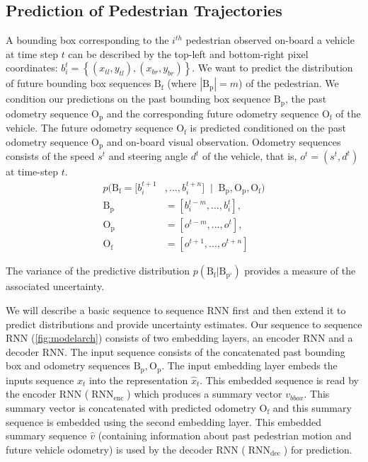 \subsection{Prediction of Pedestrian Trajectories}\label{sec:pedestrian_motion}
A bounding box corresponding to the $i^{th}$ pedestrian observed on-board a vehicle at time step $t$ can be described by the top-left and bottom-right pixel coordinates: $b_{i}^{t} = \left\{(x_{tl},y_{tl}),(x_{br},y_{br})\right\}$. We want to predict the distribution of future bounding box sequences $\text{B}_{\text{f}}$ (where $| \text{B}_{\text{p}}| = m$) of the pedestrian. We condition our predictions on the past bounding box sequence $\text{B}_{\text{p}}$, the past odometry sequence $\text{O}_{\text{p}}$ and the corresponding future odometry sequence $\text{O}_{\text{f}}$ of the vehicle. The future odometry sequence $\text{O}_{\text{f}}$ is predicted conditioned on the past odometry sequence $\text{O}_{\text{p}}$ and on-board visual observation. Odometry sequences consists of the speed $s^{t}$ and steering angle $d^{t}$ of the vehicle, that is, $o^{t} = (s^{t},d^{t})$ at time-step $t$.
\begin{align*}
    p(\text{B}_{\text{f}} = [ b_{i}^{t+1}&, ... , b_{i}^{t+n}] \; \mid \; \text{B}_{\text{p}}, \text{O}_{\text{p}}, \text{O}_{\text{f}} ) \\
    \text{B}_{\text{p}} &= [ b_{i}^{t-m}, ... , b_{i}^{t} ],\;\\
    \text{O}_{\text{p}} &= [  o^{t-m}, ... ,o^{t} ], \; \\
    \text{O}_{\text{f}} &= [ o^{t+1}, ... ,o^{t+n}] 
\end{align*}

 The variance of the predictive distribution $p(\text{B}_{\text{f}} | \text{B}_{\text{p`}})$ provides a measure of the associated uncertainty.

 We will describe a basic sequence to sequence RNN first and then extend it to predict distributions and provide uncertainty estimates. Our  sequence to sequence RNN (\autoref{fig:modelarch}) consists of two embedding layers, an encoder RNN and a decoder RNN. The input sequence consists of the concatenated past bounding box and odometry sequences $\text{B}_{\text{p}}, \text{O}_{\text{p}}$. The input embedding layer embeds the inputs sequence $x_{t}$ into the representation $\hat{x}_{t}$.  This embedded  sequence is read by the encoder RNN ($\operatorname{RNN}_{\text{enc}}$) which produces a summary vector $v_{bbox}$. This summary vector is concatenated with predicted odometry $\text{O}_{\text{f}}$ and this summary sequence is embedded using the second embedding layer. This embedded summary sequence $\hat{v}$ (containing information about past pedestrian motion and future vehicle odometry) is used by the decoder RNN ($\operatorname{RNN}_{\text{dec}}$) for prediction. 

